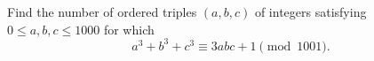 Find the number of ordered triples $(a,b,c)$ of integers satisfying $0\le a,b,c \le 1000$ for which \[a^3+b^3+c^3\equiv 3abc+1\pmod{1001}.\]
